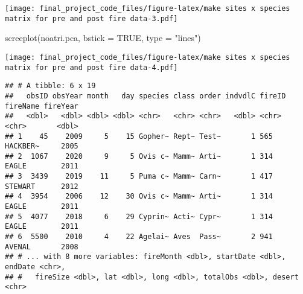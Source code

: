 \documentclass[
]{article}
\newenvironment{Shaded}{\begin{snugshade}}{\end{snugshade}}
\newcommand{\AttributeTok}[1]{\textcolor[rgb]{0.77,0.63,0.00}{#1}}
\newcommand{\ConstantTok}[1]{\textcolor[rgb]{0.00,0.00,0.00}{#1}}
\newcommand{\DecValTok}[1]{\textcolor[rgb]{0.00,0.00,0.81}{#1}}
\newcommand{\FunctionTok}[1]{\textcolor[rgb]{0.00,0.00,0.00}{#1}}
\newcommand{\NormalTok}[1]{#1}
\newcommand{\OtherTok}[1]{\textcolor[rgb]{0.56,0.35,0.01}{#1}}
\newcommand{\SpecialCharTok}[1]{\textcolor[rgb]{0.00,0.00,0.00}{#1}}
\newcommand{\StringTok}[1]{\textcolor[rgb]{0.31,0.60,0.02}{#1}}
\begin{document}
\texttt{[image: final\_project\_code\_files/figure-latex/make sites x species matrix for pre and post fire data-3.pdf]}

\begin{Shaded}
\begin{Highlighting}[]
\FunctionTok{screeplot}\NormalTok{(noatri.pca, }\AttributeTok{bstick =} \ConstantTok{TRUE}\NormalTok{, }\AttributeTok{type =} \StringTok{"lines"}\NormalTok{)}
\end{Highlighting}
\end{Shaded}

\texttt{[image: final\_project\_code\_files/figure-latex/make sites x species matrix for pre and post fire data-4.pdf]}

\begin{Shaded}
\end{Shaded}

\begin{verbatim}
## # A tibble: 6 x 19
##   obsID obsYear month   day species class order indvdlC fireID fireName fireYear
##   <dbl>   <dbl> <dbl> <dbl> <chr>   <chr> <chr>   <dbl> <chr>  <chr>       <dbl>
## 1    45    2009     5    15 Gopher~ Rept~ Test~       1 565    HACKBER~     2005
## 2  1067    2020     9     5 Ovis c~ Mamm~ Arti~       1 314    EAGLE        2011
## 3  3439    2019    11     5 Puma c~ Mamm~ Carn~       1 417    STEWART      2012
## 4  3954    2006    12    30 Ovis c~ Mamm~ Arti~       1 314    EAGLE        2011
## 5  4077    2018     6    29 Cyprin~ Acti~ Cypr~       1 314    EAGLE        2011
## 6  5500    2010     4    22 Agelai~ Aves  Pass~       2 941    AVENAL       2008
## # ... with 8 more variables: fireMonth <dbl>, startDate <dbl>, endDate <chr>,
## #   fireSize <dbl>, lat <dbl>, long <dbl>, totalObs <dbl>, desert <chr>
\end{verbatim}
\end{document}
